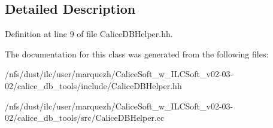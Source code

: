 \subsection{Detailed Description}


Definition at line 9 of file Calice\-D\-B\-Helper.\-hh.



The documentation for this class was generated from the following files\-:\begin{DoxyCompactItemize}
\item 
/nfs/dust/ilc/user/marquezh/\-Calice\-Soft\-\_\-w\-\_\-\-I\-L\-C\-Soft\-\_\-v02-\/03-\/02/calice\-\_\-db\-\_\-tools/include/Calice\-D\-B\-Helper.\-hh\item 
/nfs/dust/ilc/user/marquezh/\-Calice\-Soft\-\_\-w\-\_\-\-I\-L\-C\-Soft\-\_\-v02-\/03-\/02/calice\-\_\-db\-\_\-tools/src/Calice\-D\-B\-Helper.\-cc\end{DoxyCompactItemize}

